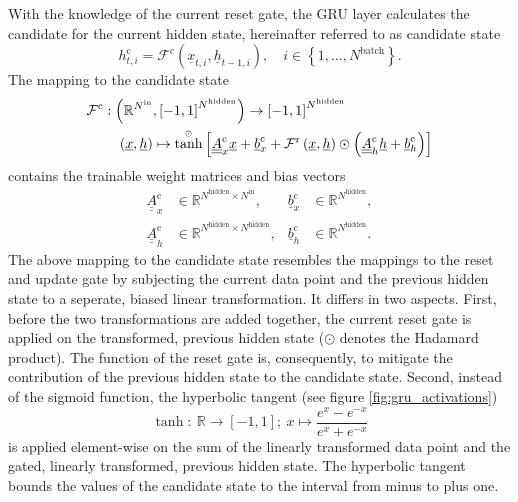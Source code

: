 With the knowledge of the current reset gate,
the GRU layer calculates the candidate for the current hidden state,
hereinafter referred to as candidate state
\begin{equation}
    h^\text{c}_{t,i}
    =
    \mathcal{F}^\text{c} \left( \underline x_{t,i}, \underline h_{t-1,i}\right)
    ,\quad i \in \left\{1, \dots, N^\text{batch}\right\}.
\end{equation}
The mapping to the candidate state
\begin{align} \label{eq:gru_candidate}
    \mathcal{F}^\text{c}
    &:
    \left(
        \mathbb{R}^{N^\text{in}}, \left[-1, 1\right]^{N^\text{hidden}}
    \right)
    \rightarrow
    \left[-1, 1\right]^{N^\text{hidden}}
    \nonumber \\ & \quad
    \left(\underline x, \underline h \right)
    \mapsto
    \overset{\scriptscriptstyle \odot}{\tanh} \left[
        \underline{\underline A}^\text{c}_{x}
        \underline x
        +
        \underline b^\text{c}_{x}
        +
        \mathcal{F}^\text{r} \left(\underline x, \underline h \right)
        \odot
        \left(
            \underline{\underline A}^\text{c}_{h}
            \underline h
            +
            \underline b^\text{c}_{h}
        \right)
    \right]
\end{align}
contains the trainable weight matrices and bias vectors
\begin{align} \label{eq:gru_candidate_params}
    \underline{\underline A}^\text{c}_{x} & \in \mathbb{R}^{
        N^\text{hidden}
        \times
        N^\text{in}
    },
    & \underline{b}^\text{c}_{x} & \in \mathbb{R}^{N^\text{hidden}},
    \nonumber \\
    \underline{\underline A}^\text{c}_{h} & \in \mathbb{R}^{
        N^\text{hidden}
        \times
        N^\text{hidden}
    },
    & \underline{b}^\text{c}_{h} & \in \mathbb{R}^{N^\text{hidden}}.
\end{align}
The above mapping to the candidate state
resembles the mappings to the reset 
and update
gate
by subjecting the current data point and the previous hidden state
to a seperate, biased linear transformation.
It differs in two aspects.
First, before the two transformations are added together,
the current reset gate is applied on the transformed, previous hidden state
($\odot$ denotes the Hadamard product).
The function of the reset gate is, consequently,
to mitigate the contribution of the previous hidden state to the candidate state.
Second, instead of the sigmoid function,
the hyperbolic tangent \cite{D.1966} (see figure \ref{fig:gru_activations})
\begin{equation}
    \tanh
    :\ 
    \mathbb{R}
    \rightarrow
    \left[
        -1,1
    \right]
    ;\ 
    x 
    \mapsto 
    \frac{
        e^x - e^{-x}
    }{
        e^x + e^{-x}
    }
\end{equation}
is applied element-wise on the sum of the linearly transformed data point 
and the gated, linearly transformed, previous hidden state.
The hyperbolic tangent bounds the values
of the candidate state to the interval from minus to plus one. 



